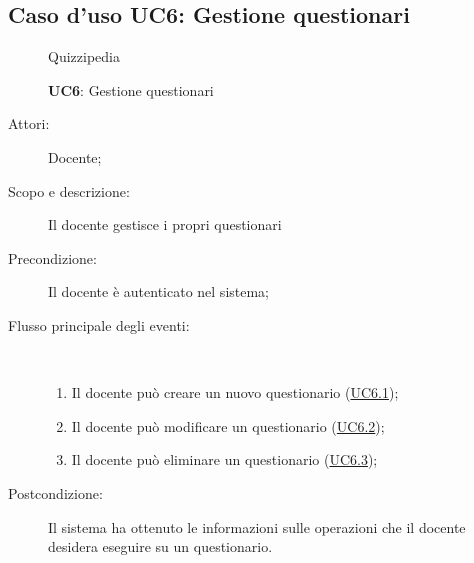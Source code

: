 \subsection{Caso d'uso UC6: Gestione questionari}
	\begin{figure}[H]
		\centering
		\begin{resizedtikzpicture}{\textwidth}
		\begin{umlsystem}[x=0, fill=lightgray!20]{Quizzipedia}
		\end{umlsystem}
		\end{resizedtikzpicture}
		\caption{\textbf{UC6}: Gestione questionari}
		\label{UC6}
	\end{figure}
\begin{description}
\item[Attori:] Docente;
\item[Scopo e descrizione:] Il docente gestisce i propri questionari
      \item[Precondizione:] Il docente è autenticato nel sistema;

        \item[Flusso principale degli eventi:] \ 
 \begin{enumerate}
          \item Il docente può creare un nuovo questionario (\hyperlink{UC6.1}{UC6.1});
          \item Il docente può modificare un questionario (\hyperlink{UC6.2}{UC6.2});
          \item Il docente può eliminare un questionario (\hyperlink{UC6.3}{UC6.3});

      \end{enumerate}
    \item[Postcondizione:] Il sistema ha ottenuto le informazioni sulle operazioni che il docente desidera eseguire su un questionario.
  \end{description}
\hypertarget{UC6.1}{}
